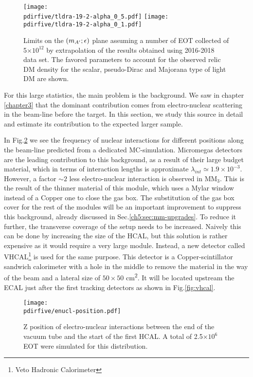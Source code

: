 \begin{figure}[bht!]
  \centering
  \texttt{[image: \\pdirfive/tldra-19-2-alpha\_0\_5.pdf]}
  \texttt{[image: \\pdirfive/tldra-19-2-alpha\_0\_1.pdf]}
  \caption[Sensitivity projection for invisible mode 2021]{Limits on the $(m_{A'};\epsilon)$ plane assuming a number of EOT collected of 5$\times 10^{12}$ by extrapolation of the results obtained using 2016-2018 data set. The favored parameters to account for the observed relic DM density for the scalar, pseudo-Dirac and Majorana type of light DM are shown.}
  \label{fig:dm-sens-proj}
\end{figure}

For this large statistics, the main problem is the background.  We saw in chapter \ref{chapter3} that the dominant contribution comes from electro-nuclear scattering in the beam-line before the target. In this section, we study this source in detail and estimate its contribution to the expected larger sample.

In Fig.\ref{fig:enucl-position} we see the frequency of nuclear interactions for different positions along the beam-line predicted from a dedicated MC-simulation. Micromegas detectors are the leading contribution to this background, as a result of their large budget material, which in terms of interaction lengths is approximate $\lambda_{int} \simeq 1.9 \times 10^{-3}$. However, a factor $\sim 2$ less electro-nuclear interaction is observed in MM$_3$. This is the result of the thinner material of this module, which uses a Mylar window instead of a Copper one to close the gas box. The substitution of the gas box cover for the rest of the modules will be an important improvement to suppress this background, already discussed in Sec.\ref{ch5:sec:mm-upgrades}. To reduce it further, the transverse coverage of the setup needs to be increased. Naively this can be done by increasing the size of the HCAL, but this solution is rather expensive as it would require a very large module. Instead, a new detector called VHCAL\footnote{Veto Hadronic Calorimeter} is used for the same purpose. This detector is a Copper-scintillator sandwich calorimeter with a hole in the middle to remove the material in the way of the beam and a lateral size of $50\times50$ \si{\centi\meter\squared}. It will be located upstream the ECAL just after the first tracking detectors as shown in Fig.\ref{fig:vhcal}.
\begin{figure}[bth!]
  \centering
  \texttt{[image: \\pdirfive/enucl-position.pdf]}
  \caption[electro-nuclear interaction position]{Z position of electro-nuclear interactions between the end of the vacuum tube and the start of the first HCAL. A total of 2.5$\times 10^6$ EOT were simulated for this distribution.}
  \label{fig:enucl-position}
\end{figure}

